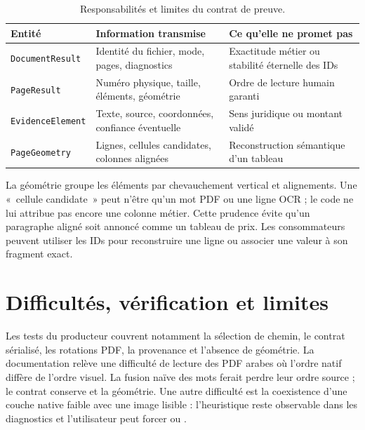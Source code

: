 \begin{table}[htbp]\centering\tighttable
\begin{tabularx}{\textwidth}{@{}p{31mm}Y Y@{}}\toprule
Entité & Information transmise & Ce qu'elle ne promet pas\\\midrule
\texttt{DocumentResult} & Identité du fichier, mode, pages, diagnostics & Exactitude métier ou stabilité éternelle des IDs\\
\texttt{PageResult} & Numéro physique, taille, éléments, géométrie & Ordre de lecture humain garanti\\
\texttt{EvidenceElement} & Texte, source, coordonnées, confiance éventuelle & Sens juridique ou montant validé\\
\texttt{PageGeometry} & Lignes, cellules candidates, colonnes alignées & Reconstruction sémantique d'un tableau\\\bottomrule
\end{tabularx}
\caption{Responsabilités et limites du contrat de preuve.}\label{tab:schema-di}
\end{table}

La géométrie groupe les éléments par chevauchement vertical et alignements. Une «~cellule candidate~» peut n'être qu'un mot PDF ou une ligne OCR ; le code ne lui attribue pas encore une colonne métier. Cette prudence évite qu'un paragraphe aligné soit annoncé comme un tableau de prix. Les consommateurs peuvent utiliser les IDs pour reconstruire une ligne ou associer une valeur à son fragment exact.

\section{Difficultés, vérification et limites}
Les tests du producteur couvrent notamment la sélection de chemin, le contrat sérialisé, les rotations PDF, la provenance et l'absence de géométrie. La documentation relève une difficulté de lecture des PDF arabes où l'ordre natif diffère de l'ordre visuel. La fusion naïve des mots ferait perdre leur ordre source ; le contrat conserve \texttt{} et la géométrie. Une autre difficulté est la coexistence d'une couche native faible avec une image lisible : l'heuristique reste observable dans les diagnostics et l'utilisateur peut forcer \texttt{} ou \texttt{}.

